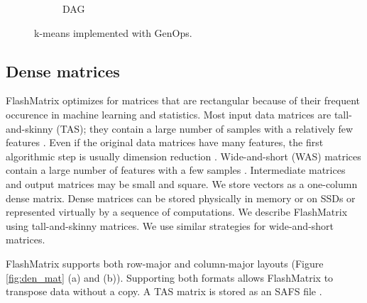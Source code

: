 \begin{figure}
\begin{subfigure}{.25\textwidth}
	\label{fig:dag}
	\caption{DAG}
	\end{subfigure}
  \vspace{-12pt}
	\caption{k-means implemented with GenOps.}
	\label{fig:kmeans}
  \vspace{-8pt}
\end{figure}

\vspace{-8pt}
\subsection{Dense matrices}
\vspace{-4pt}
FlashMatrix optimizes for matrices that are rectangular because
of their frequent occurence in machine learning and statistics.
Most input data matrices are tall-and-skinny (TAS); they contain
a large number of samples with a relatively few features \cite{}. 
Even if the original data matrices have many features,
the first algorithmic step is usually dimension reduction \cite{}. 
Wide-and-short (WAS) matrices contain a large number of features with
a few samples \cite{}. Intermediate matrices and output matrices may
be small and square. We store vectors as a one-column dense matrix.
Dense matrices can be stored physically in memory or on SSDs or represented
virtually by a sequence of computations.
We describe FlashMatrix using tall-and-skinny matrices.  We use similar strategies for wide-and-short matrices.



FlashMatrix supports both row-major and column-major
layouts (Figure \ref{fig:den_mat} (a) and (b)).  Supporting both formats
allows FlashMatrix to transpose data without a copy. A TAS matrix is stored
as an SAFS file \cite{safs}.

